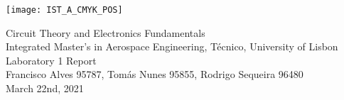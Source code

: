 
\thispagestyle {empty}

\texttt{[image: IST\_A\_CMYK\_POS]}

\begin{center}
%
\vspace{1.0cm}

\vspace{1cm}
{\FontLb Circuit Theory and Electronics Fundamentals} \\ %
\vspace{1cm}
{\FontSn Integrated Master's in Aerospace Engineering, Técnico, University of Lisbon} \\ 
\vspace{1cm}
{\FontSn Laboratory 1 Report} \\ 
\vspace{1cm}
{\FontSn Francisco Alves 95787, Tomás Nunes 95855, Rodrigo Sequeira 96480} \\ 
\vspace{1cm}
{\FontSn March 22nd, 2021} 
%
\end{center}

